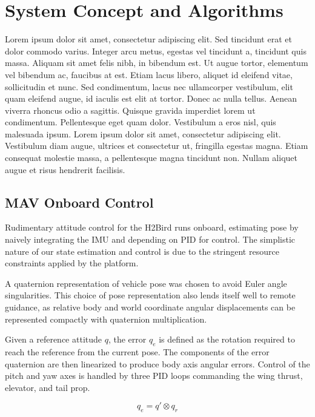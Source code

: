 \documentclass[letterpaper, 10 pt, conference]{ieeeconf}
\begin{document}
\section{System Concept and Algorithms}
Lorem ipsum dolor sit amet, consectetur adipiscing elit. Sed tincidunt erat et dolor commodo varius. Integer arcu metus, egestas vel tincidunt a, tincidunt quis massa. Aliquam sit amet felis nibh, in bibendum est. Ut augue tortor, elementum vel bibendum ac, faucibus at est. Etiam lacus libero, aliquet id eleifend vitae, sollicitudin et nunc. Sed condimentum, lacus nec ullamcorper vestibulum, elit quam eleifend augue, id iaculis est elit at tortor. Donec ac nulla tellus. Aenean viverra rhoncus odio a sagittis. Quisque gravida imperdiet lorem ut condimentum. Pellentesque eget quam dolor. Vestibulum a eros nisl, quis malesuada ipsum. Lorem ipsum dolor sit amet, consectetur adipiscing elit. Vestibulum diam augue, ultrices et consectetur ut, fringilla egestas magna. Etiam consequat molestie massa, a pellentesque magna tincidunt non. Nullam aliquet augue et risus hendrerit facilisis.

\subsection{MAV Onboard Control}
Rudimentary attitude control for the H2Bird runs onboard, estimating pose by naively integrating the IMU and depending on PID for control. The simplistic nature of our state estimation and control is due to the stringent resource constraints applied by the platform.

A quaternion representation of vehicle pose was chosen to avoid Euler angle singularities. This choice of pose representation also lends itself well to remote guidance, as relative body and world coordinate angular displacements can be represented compactly with quaternion multiplication. 

Given a reference attitude $q$, the error $q_e$ is defined as the rotation required to reach the reference from the current pose. The components of the error quaternion are then linearized to produce body axis angular errors. Control of the pitch and yaw axes is handled by three PID loops commanding the wing thrust, elevator, and tail prop.

\begin{equation}
\label{quat_error}
q_e = q'\otimes q_r
\end{equation}
\end{document}
